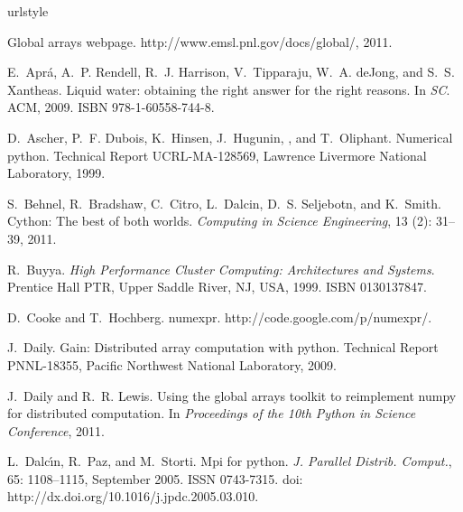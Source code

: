 \documentclass{sigplanconf}
\begin{document}
\begin{thebibliography}{36}
\providecommand{\natexlab}[1]{#1}
\providecommand{\url}[1]{\texttt{#1}}
\expandafter\ifx\csname urlstyle\endcsname\relax
  \providecommand{\doi}[1]{doi: #1}\else
  \providecommand{\doi}{doi: \begingroup \urlstyle{rm}\Url}\fi

Global arrays webpage.
\newblock http://www.emsl.pnl.gov/docs/global/, 2011.

E.~Apr\'{a}, A.~P. Rendell, R.~J. Harrison, V.~Tipparaju, W.~A. deJong, and
  S.~S. Xantheas.
\newblock Liquid water: obtaining the right answer for the right reasons.
\newblock In \emph{SC}. ACM, 2009.
\newblock ISBN 978-1-60558-744-8.

D.~Ascher, P.~F. Dubois, K.~Hinsen, J.~Hugunin, , and T.~Oliphant.
\newblock Numerical python.
\newblock Technical Report UCRL-MA-128569, Lawrence Livermore National
  Laboratory, 1999.

S.~Behnel, R.~Bradshaw, C.~Citro, L.~Dalcin, D.~S. Seljebotn, and K.~Smith.
\newblock Cython: The best of both worlds.
\newblock \emph{Computing in Science Engineering}, 13 (2):
  31--39, 2011.

R.~Buyya.
\newblock \emph{High Performance Cluster Computing: Architectures and Systems}.
\newblock Prentice Hall PTR, Upper Saddle River, NJ, USA, 1999.
\newblock ISBN 0130137847.

D.~Cooke and T.~Hochberg.
\newblock numexpr.
\newblock http://code.google.com/p/numexpr/.

J.~Daily.
\newblock Gain: Distributed array computation with python.
\newblock Technical Report PNNL-18355, Pacific Northwest National Laboratory,
  2009.

J.~Daily and R.~R. Lewis.
\newblock Using the global arrays toolkit to reimplement numpy for distributed
  computation.
\newblock In \emph{Proceedings of the 10th Python in Science Conference}, 2011.

L.~Dalc\'{\i}n, R.~Paz, and M.~Storti.
\newblock Mpi for python.
\newblock \emph{J. Parallel Distrib. Comput.}, 65: 1108--1115,
  September 2005.
\newblock ISSN 0743-7315.
\newblock \doi{http://dx.doi.org/10.1016/j.jpdc.2005.03.010}.


\end{thebibliography}
\end{document}
